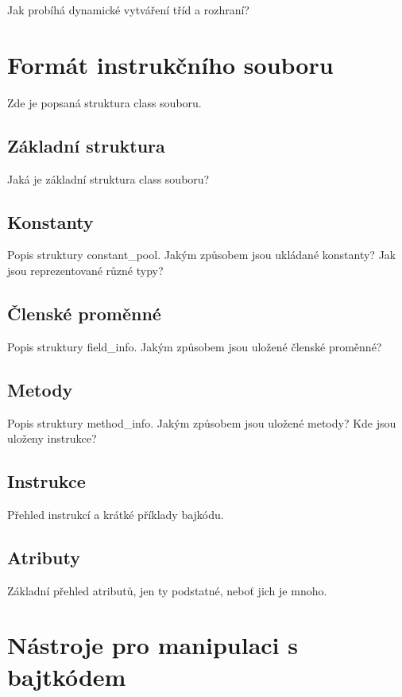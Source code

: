 Jak probíhá dynamické vytváření tříd a rozhraní?


\chapter{Formát instrukčního souboru}

Zde je popsaná struktura class souboru.

\section{Základní struktura}

Jaká je základní struktura class souboru?

\section{Konstanty}

Popis struktury constant\_pool. Jakým způsobem jsou ukládané konstanty? Jak jsou reprezentované různé typy?

\section{Členské proměnné}

Popis struktury field\_info. Jakým způsobem jsou uložené členské proměnné?

\section{Metody}

Popis struktury method\_info. Jakým způsobem jsou uložené metody? Kde jsou uloženy instrukce?

\section{Instrukce}

Přehled instrukcí a krátké příklady bajkódu.

\section{Atributy}

Základní přehled atributů, jen ty podstatné, neboť jich je mnoho.


\chapter{Nástroje pro manipulaci s bajtkódem}

